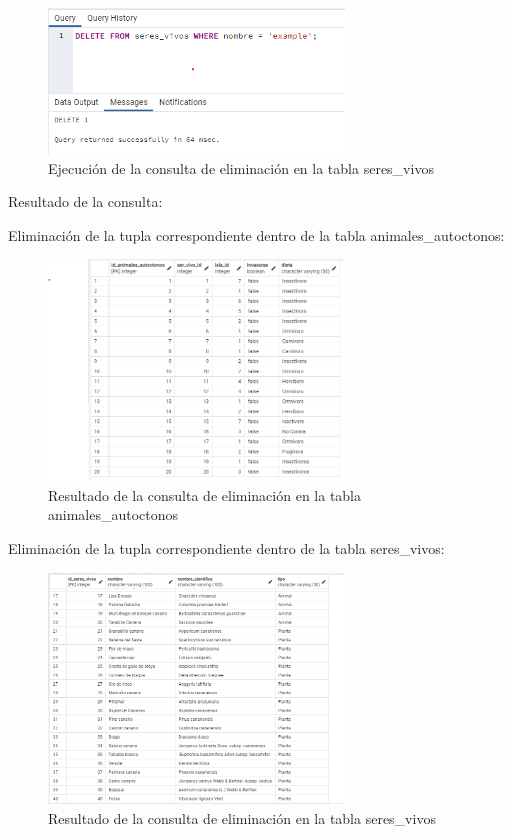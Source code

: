 \documentclass[11pt]{report}
\begin{document}
\begin{figure}[H]
      \centering
      \includegraphics[width=0.7\textwidth]{src/img/delete_animales_autoctonos.png}
      \caption{Ejecución de la consulta de eliminación en la tabla seres\_vivos}
      \label{fig:delete_operation}
\end{figure}

Resultado de la consulta:

Eliminación de la tupla correspondiente dentro de la tabla animales\_autoctonos:

\begin{figure}[H]
      \centering
      \includegraphics[width=0.7\textwidth]{src/img/tabla_animales_autoctonos_despues_delete.png}
      \caption{Resultado de la consulta de eliminación en la tabla animales\_autoctonos}
      \label{fig:delete_animales_autoctonos}
\end{figure}

Eliminación de la tupla correspondiente dentro de la tabla seres\_vivos:

\begin{figure}[H]
      \centering
      \includegraphics[width=0.7\textwidth]{src/img/tabla_seres_vivos_despues_delete.png}
      \caption{Resultado de la consulta de eliminación en la tabla seres\_vivos}
      \label{fig:delete_seres_vivos}
\end{figure}
\end{document}
